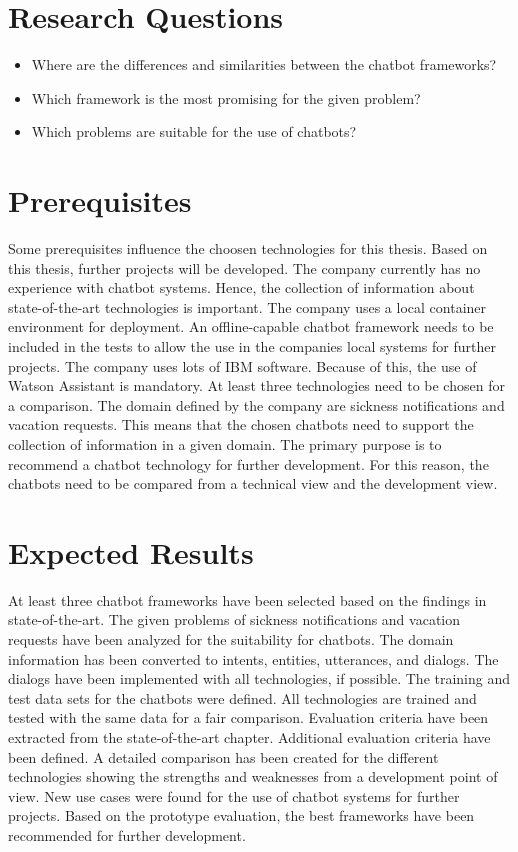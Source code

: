 \section{Research Questions}
\begin{itemize}
    \item Where are the differences and similarities between the chatbot frameworks?
    \item Which framework is the most promising for the given problem?
    \item Which problems are suitable for the use of chatbots?
\end{itemize}

\section{Prerequisites} \label{sec:prereq}
Some prerequisites influence the choosen technologies for this thesis.
Based on this thesis, further projects will be developed.
The company currently has no experience with chatbot systems.
Hence, the collection of information about state-of-the-art technologies is important.
The company uses a local container environment for deployment.
An offline-capable chatbot framework needs to be included in the tests to 
allow the use in the companies local systems for further projects.
The company uses lots of IBM software.
Because of this, the use of Watson Assistant is mandatory.
At least three technologies need to be chosen for a comparison.
The domain defined by the company are sickness notifications and 
vacation requests.
This means that the chosen chatbots need to support the collection of 
information in a given domain.
The primary purpose is to recommend a chatbot technology for further development.
For this reason, the chatbots need to be compared from a technical view and the development view.


\section{Expected Results}
At least three chatbot frameworks have been selected based on the findings in state-of-the-art.
The given problems of sickness notifications and vacation requests have been analyzed for the suitability for chatbots.
The domain information has been converted to intents, entities, utterances, and dialogs.
The dialogs have been implemented with all technologies, if possible.
The training and test data sets for the chatbots were defined.
All technologies are trained and tested with the same data for a fair comparison.
Evaluation criteria have been extracted from the state-of-the-art chapter.
Additional evaluation criteria have been defined.
A detailed comparison has been created for the different technologies showing the strengths and weaknesses from a development point of view.
New use cases were found for the use of chatbot systems for further projects.
Based on the prototype evaluation, the best frameworks have been recommended for further development.